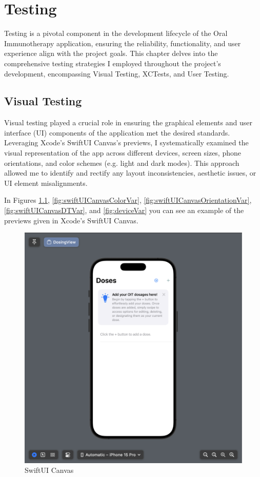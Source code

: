 \chapter{Testing}

Testing is a pivotal component in the development lifecycle of the Oral Immunotherapy application, ensuring the reliability, functionality, and user experience align with the project goals. This chapter delves into the comprehensive testing strategies I employed throughout the project's development, encompassing Visual Testing, XCTests, and User Testing.

\section{Visual Testing}

Visual testing played a crucial role in ensuring the graphical elements and user interface (UI) components of the application met the desired standards. Leveraging Xcode's SwiftUI Canvas's previews, I systematically examined the visual representation of the app across different devices, screen sizes, phone orientations, and color schemes (e.g. light and dark modes). This approach allowed me to identify and rectify any layout inconsistencies, aesthetic issues, or UI element misalignments. 

In Figures \ref{fig:swiftUICanvas}, \ref{fig:swiftUICanvasColorVar}, \ref{fig:swiftUICanvasOrientationVar}, \ref{fig:swiftUICanvasDTVar}, and \ref{fig:deviceVar} you can see an example of the previews given in Xcode's SwiftUI Canvas.

\begin{figure} [H]
    \centering
    \includegraphics[width=0.5\linewidth]{thesis//chapters//images/SwiftUICanvas.png}
    \caption{SwiftUI Canvas}
    \label{fig:swiftUICanvas}
\end{figure}

